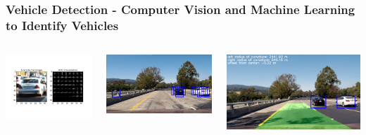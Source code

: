 \documentclass[mathserif]{beamer}
\begin{document}
\begin{frame}
\frametitle{Vehicle Detection - Computer Vision and Machine Learning to Identify Vehicles}

\begin{columns}[c]
\column{1.5in}
\includegraphics[width=45mm]{vd1.png}

\includegraphics[width=5.5cm]{vd2.jpg}

\column{3in}
\begin{center}
\includegraphics[width=7cm]{vd3.jpg}

\vspace{0.1cm}
\begin{columns}[c]
\column{1.5in}

\end{columns}
\end{center}
\end{columns}

\end{frame}
\end{document}
